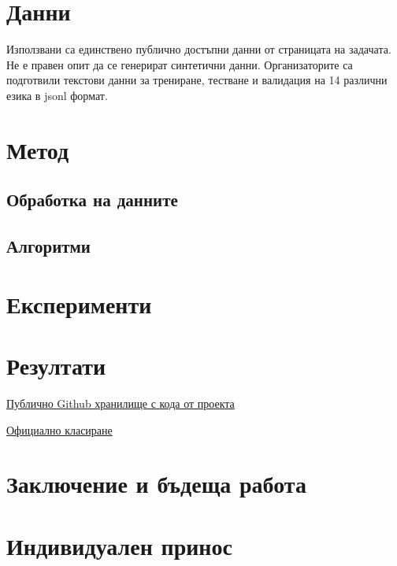 \documentclass[12pt]{article}
\begin{document}
	\section{Данни}
	
	Използвани са единствено публично достъпни данни от страницата на задачата. Не е правен опит да се генерират синтетични данни. Организаторите са подготвили текстови данни за трениране, тестване и валидация на 14 различни езика в jsonl формат. 
	
	\section{Метод}
	
	\subsection{Обработка на данните}
	
	\subsection{Алгоритми}
	
	\section{Експерименти}
	
	\section{Резултати}
	
	\href{https://github.com/Kr1s1m/SemEval-2025_Task-3/}{Публично Github хранилище с кода от проекта}
	
	\href{https://mushroomeval.pythonanywhere.com/submission/}{Официално класиране}
	
	\section{Заключение и бъдеща работа}
	
	
	
	\pagebreak
	\section{Индивидуален принос}
	
	
\end{document}
